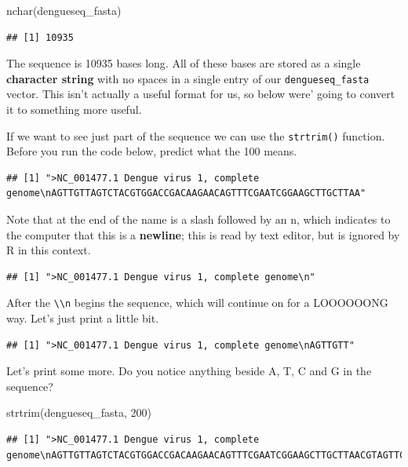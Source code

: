 \documentclass[
]{book}
\newenvironment{Shaded}{\begin{snugshade}}{\end{snugshade}}
\newcommand{\DecValTok}[1]{\textcolor[rgb]{0.00,0.00,0.81}{#1}}
\newcommand{\FunctionTok}[1]{\textcolor[rgb]{0.00,0.00,0.00}{#1}}
\newcommand{\NormalTok}[1]{#1}
\begin{document}
\begin{Shaded}
\begin{Highlighting}[]
\FunctionTok{nchar}\NormalTok{(dengueseq\_fasta)}
\end{Highlighting}
\end{Shaded}

\begin{verbatim}
## [1] 10935
\end{verbatim}

The sequence is 10935 bases long. All of these bases are stored as a single \textbf{character string} with no spaces in a single entry of our \texttt{dengueseq\_fasta} vector. This isn't actually a useful format for us, so below were' going to convert it to something more useful.

If we want to see just part of the sequence we can use the \texttt{strtrim()} function. Before you run the code below, predict what the 100 means.

\begin{verbatim}
## [1] ">NC_001477.1 Dengue virus 1, complete genome\nAGTTGTTAGTCTACGTGGACCGACAAGAACAGTTTCGAATCGGAAGCTTGCTTAA"
\end{verbatim}

Note that at the end of the name is a slash followed by an n, which indicates to the computer that this is a \textbf{newline}; this is read by text editor, but is ignored by R in this context.

\begin{verbatim}
## [1] ">NC_001477.1 Dengue virus 1, complete genome\n"
\end{verbatim}

After the \texttt{\textbackslash{}\textbackslash{}n} begins the sequence, which will continue on for a LOOOOOONG way. Let's just print a little bit.

\begin{verbatim}
## [1] ">NC_001477.1 Dengue virus 1, complete genome\nAGTTGTT"
\end{verbatim}

Let's print some more. Do you notice anything beside A, T, C and G in the sequence?

\begin{Shaded}
\begin{Highlighting}[]
\FunctionTok{strtrim}\NormalTok{(dengueseq\_fasta, }\DecValTok{200}\NormalTok{)}
\end{Highlighting}
\end{Shaded}

\begin{verbatim}
## [1] ">NC_001477.1 Dengue virus 1, complete genome\nAGTTGTTAGTCTACGTGGACCGACAAGAACAGTTTCGAATCGGAAGCTTGCTTAACGTAGTTCTAACAGT\nTTTTTATTAGAGAGCAGATCTCTGATGAACAACCAACGGAAAAAGACGGGTCGACCGTCTTTCAATATGC\nTGAAACGCGCGAG"
\end{verbatim}
\end{document}
